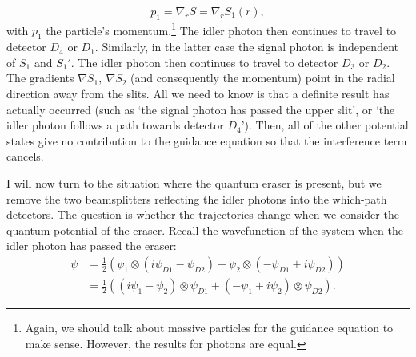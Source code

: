\documentclass[12pt]{article}
\numberwithin{equation}{section}
\begin{document}
\begin{equation}
p_1=\nabla_{r}S= \nabla_{r}S_1(r),
\end{equation} with $p_1$ the particle's momentum.\footnote{Again, we should talk about massive particles for the guidance equation to make sense. However, the results for photons are equal.} The idler photon then continues to travel to detector $D_4$ or $D_1$. Similarly, in the latter case the signal photon is independent of $S_1$ and $S_1'$. The idler photon then continues to travel to detector $D_3$ or $D_2$. The gradients $\nabla S_1, \ \nabla S_2$ (and consequently the momentum) point in the radial direction away from the slits. All we need to know is that a definite result has actually occurred (such as `the signal photon has passed the upper slit', or `the idler photon follows a path towards detector $D_4$'). Then, all of the other potential states give no contribution to the guidance equation so that the interference term cancels.

I will now turn to the situation where the quantum eraser is present, but we remove the two beamsplitters reflecting the idler photons into the which-path detectors. The question is whether the trajectories change when we consider the quantum potential of the eraser.
Recall the wavefunction of the system when the idler photon has passed the eraser:
\begin{align}
\label{eraser}
\psi &= \frac{1}{2}(\psi_1\otimes (i\psi_{D1}-\psi_{D2})+\psi_2\otimes (-\psi_{D1}+i\psi_{D2})) \nonumber \\
&= \frac{1}{2}((i\psi_{1}-\psi_{2})\otimes\psi_{D1} + (-\psi_{1}+i\psi_{2})\otimes\psi_{D2}).
\end{align}
\end{document}
